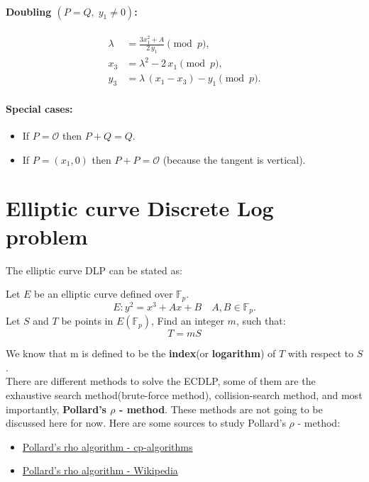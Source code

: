 \documentclass[12pt,a4paper]{report}
\begin{document}
\paragraph{Doubling \((P = Q,\;y_1 \neq 0)\):}
\begin{align}
  \lambda &= \frac{3x_1^2 + A}{2\,y_1} \pmod p, \\
  x_3     &= \lambda^2 - 2\,x_1 \pmod p, \\
  y_3     &= \lambda\,(x_1 - x_3) - y_1 \pmod p.
\end{align}

\paragraph{Special cases:}
\begin{itemize}
  \item If \(P = \mathcal O\) then \(P+Q = Q\).
  \item If \(P = (x_1,0)\) then \(P+P = \mathcal O\) (because the tangent is vertical).
\end{itemize}

\section{Elliptic curve Discrete Log problem}
The elliptic curve DLP can be stated as:
\begin{boxC}
    Let $E$ be an elliptic curve defined over $\mathbb{F}_p$.
    \[
    E: y^2 = x^3 + Ax + B \quad A,B \in \mathbb{F}_p.
    \]
    Let $S$ and $T$ be points in $E(\mathbb{F}_p)$, Find an integer $m$, such that:
    \[
    T = mS
    \]
\end{boxC}
We know that m is defined to be the \textbf{index}(or \textbf{logarithm}) of $T$ with respect to $S$.\\
There are different methods to solve the ECDLP, some of them are the exhaustive search method(brute-force method), collision-search method, and most importantly,\textbf{ Pollard's $\rho$ - method}. These methods are not going to be discussed here for now.
Here are some sources to study Pollard's $\rho$ - method:
\begin{itemize}
    \item \href{https://cp-algorithms.com/algebra/factorization.html#pollards-rho-algorithm}{Pollard's rho algorithm - cp-algorithms}
    \item \href{https://en.wikipedia.org/wiki/Pollard%27s_rho_algorithm}{Pollard's rho algorithm - Wikipedia}
\end{itemize}
\end{document}
